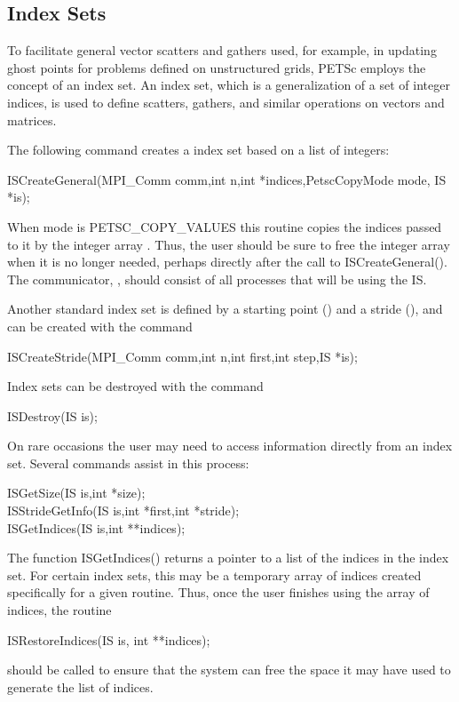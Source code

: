 \subsection{Index Sets} 
\label{sec_indexset}

To facilitate general vector scatters and gathers used, for example, in updating 
ghost points for problems defined on unstructured grids, PETSc employs the 
concept of an index set.  An index set, which is a generalization of a 
set of integer indices, is used to define scatters, gathers, and similar 
operations on vectors and matrices. 

The following command creates a index set based on a list 
of integers: 
\begin{tabbing}
  ISCreateGeneral(MPI\_Comm comm,int n,int *indices,PetscCopyMode mode, IS *is);
\end{tabbing}
When mode is PETSC\_COPY\_VALUES this routine copies the  indices passed 
to it by the integer array .  
Thus, the user should be sure to free the integer array  
when it is no longer needed, perhaps directly after the call to 
ISCreateGeneral(). The communicator, , should consist of all 
processes that will be using the IS.

Another standard index set is defined by a starting point () and a
stride (),  and can be created with the command
\begin{tabbing}
  ISCreateStride(MPI\_Comm comm,int n,int first,int step,IS *is);
\end{tabbing}

Index sets can be destroyed with the command 
\begin{tabbing}
  ISDestroy(IS is); 
\end{tabbing}

On rare occasions the user may need to access information directly 
from an index set. 
Several commands 
assist in this process:
\begin{tabbing}
  ISGetSize(IS is,int *size);\\
  ISStrideGetInfo(IS is,int *first,int *stride);\\
  ISGetIndices(IS is,int **indices);
\end{tabbing}
The function ISGetIndices() returns a pointer to a list of the 
indices in the index set. 
For certain index sets, this may be a 
temporary array of indices created specifically for a given routine. 
Thus, once the user finishes using the array of indices, 
the routine 
\begin{tabbing}
  ISRestoreIndices(IS is, int **indices); 
\end{tabbing}
should be called to ensure that the system can free the space it 
may have used to generate the list of indices.

